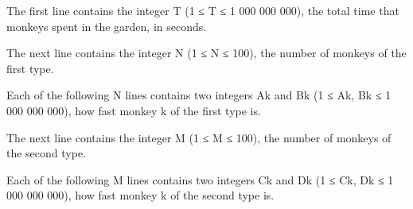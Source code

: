 The first line contains the integer T (1 ≤ T ≤ 1 000 000 000), the total time that monkeys spent in the garden, in seconds.  

   The next line contains the integer N (1 ≤ N ≤ 100), the number of monkeys of the first type.  

   Each of the following N lines contains two integers Ak and Bk (1 ≤ Ak, Bk ≤ 1 000 000 000), how fast monkey k of the first type is.  

   The next line contains the integer M (1 ≤ M ≤ 100), the number of monkeys of the second type.  

   Each of the following M lines contains two integers Ck and Dk (1 ≤ Ck, Dk ≤ 1 000 000 000), how fast monkey k of the second type is.  

\
